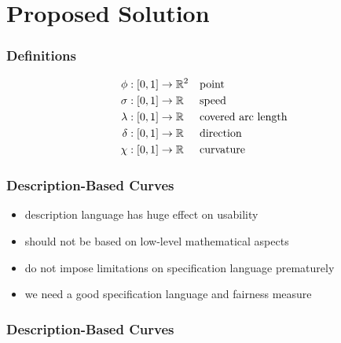 \documentclass[mathserif]{beamer}
\begin{document}
	\section{Proposed Solution}

		\begin{frame}
			\frametitle{Definitions}
			\begin{align*}
				\phi    & : \left[ 0,1 \right] \rightarrow \mathbb{R}^{2} && \text{point}\\
				\sigma  & : \left[ 0,1 \right] \rightarrow \mathbb{R}   && \text{speed}\\
				\lambda & : \left[ 0,1 \right] \rightarrow \mathbb{R}   && \text{covered arc length}\\
				\delta  & : \left[ 0,1 \right] \rightarrow \mathbb{R}   && \text{direction}\\
				\chi    & : \left[ 0,1 \right] \rightarrow \mathbb{R}   && \text{curvature}
			\end{align*}
		\end{frame}

		\begin{frame}
			\frametitle{Description-Based Curves}
			\begin{itemize}
				\item description language has huge effect on usability
				\item should not be based on low-level mathematical aspects %
				\item do not impose limitations on specification language prematurely %
				\item we need a good specification language and fairness measure
			\end{itemize}
		\end{frame}

		\begin{frame}
			\frametitle{Description-Based Curves}
			\\
		\end{frame}
\end{document}
